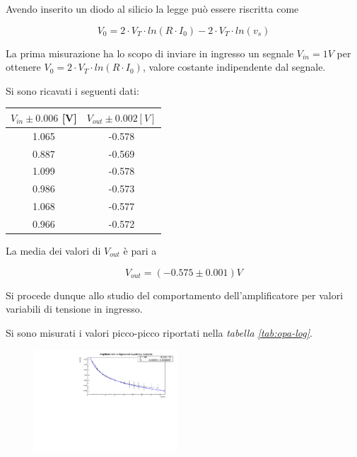 \documentclass[journal]{IEEEtran}
\begin{document}
Avendo inserito un diodo al silicio la legge può essere riscritta come 

\begin{equation}
V_0 = 2 \cdot V_T \cdot ln(R \cdot I_0) - 2 \cdot V_T \cdot ln(v_s)
\end{equation}

La prima misurazione ha lo scopo di inviare in ingresso un segnale $V_{in} = 1V$ per ottenere  $V_0 = 2 \cdot V_T \cdot ln(R \cdot I_0)$, valore costante indipendente dal segnale.

Si sono ricavati i seguenti dati:

\begin{center}
\begin{tabular}{|c|c|}
\hline
$V_{in} \pm 0.006 $ [V] & $V_{out} \pm 0.002 [V]$   \\ \hline
1.065 & -0.578 \\ \hline
0.887 & -0.569 \\ \hline
1.099 & -0.578 \\ \hline
0.986 & -0.573 \\ \hline
1.068 & -0.577 \\ \hline
0.966 & -0.572 \\ \hline
\end{tabular}
\end{center}

La media dei valori di $V_{out}$ è pari a 

\[V_{out} = (-0.575 \pm 0.001 )V\]

Si procede dunque allo studio del comportamento dell'amplificatore per valori variabili di tensione in ingresso.

Si sono misurati i valori picco-picco riportati nella \textit{tabella \ref{tab:opa-log}}.


\begin{figure}[H]%
\begin {center}
\includegraphics[width=0.48\textwidth]{analysis/output/fit_log_vout_vin.pdf}
\caption{}
\label{fig:log_ampl_fit}
\end {center}
\end{figure}
\end{document}
